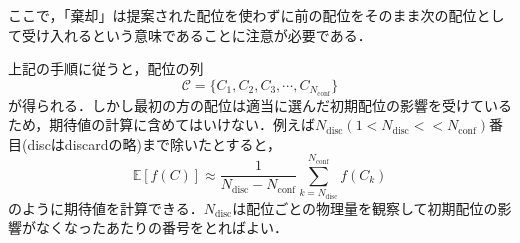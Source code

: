 \documentclass[a4paper,11pt]{jsreport}
\begin{document}
ここで，「棄却」は提案された配位を使わずに前の配位をそのまま次の配位として受け入れるという意味であることに注意が必要である．\par
上記の手順に従うと，配位の列
\begin{equation}
  \mathcal{C} = \{ C_1,C_2,C_3,\cdots,C_{N_{\text{conf}}} \}
\end{equation}
が得られる．しかし最初の方の配位は適当に選んだ初期配位の影響を受けているため，期待値の計算に含めてはいけない．例えば$N_{\text{disc}}(1<N_{\text{disc}}<<N_{\text{conf}})$番目(discはdiscardの略)まで除いたとすると，
\begin{equation}
  \mathbb{E}[f(C)] \approx \frac{1}{N_{\text{disc}} - N_{\text{conf}}}\sum_{k=N_{\text{disc}}}^{N_{\text{conf}}}f(C_k)
\end{equation}
のように期待値を計算できる．$N_{\text{disc}}$は配位ごとの物理量を観察して初期配位の影響がなくなったあたりの番号をとればよい．
\end{document}
